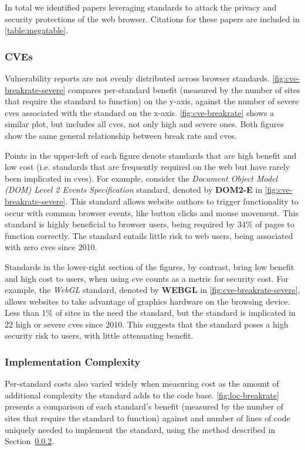 In total we identified \NumAttackPapers papers leveraging \NumAttackStandards
standards to attack the privacy and security protections of the web browser.
Citations for these papers are included in \ref{table:megatable}.


\subsubsection{CVEs}
\label{cost-benefit:results:costs-cves}


Vulnerability reports are not evenly distributed across browser standards.
\ref{fig:cve-breakrate-severe} compares per-standard
benefit (measured by the number of sites that require the standard to function)
on the y-axis, against the number of severe \gls{cve}s associated with the
standard on the x-axis.  \ref{fig:cve-breakrate} shows a similar plot, but
includes all \gls{cve}s, not only high and severe ones.  Both figures
show the same general relationship between break rate and \gls{cve}s.

Points in the upper-left of each figure denote standards that are high benefit
and low cost  (i.e. standards that are frequently required on the web but have
rarely been implicated in \gls{cve}s).  For example, consider the
\textit{Document Object Model (DOM) Level 2 Events Specification} standard,
denoted by \textbf{DOM2-E} in \ref{fig:cve-breakrate-severe}.  This
standard allows website authors to trigger functionality to occur with
common browser events, like button clicks and mouse movement.  This standard is highly
beneficial to browser users, being required by 34\% of pages to function
correctly.  The standard entails little risk to web users, being
associated with zero \gls{cve}s since 2010.

Standards in the lower-right section of the figures, by contrast, bring
low benefit and high cost to users, when using \gls{cve} counts as a metric
for security cost.  For example, the \textit{WebGL} standard, denoted by
\textbf{WEBGL} in \ref{fig:cve-breakrate-severe}, allows websites to take
advantage of graphics hardware on the browsing device.
Less than 1\% of sites in the \ATK need the standard, but
the standard is implicated in 22 high or severe \gls{cve}s since 2010.  This
suggests that the standard poses a high security risk to users, with
little attenuating benefit.


\subsubsection{Implementation Complexity}
\label{cost-benefit:results:costs-loc}

Per-standard costs also varied widely when measuring cost as the amount of
additional complexity the standard adds to the code base.
\ref{fig:loc-breakrate} presents a comparison of each standard's benefit
(measured by the number of sites that require the standard to function) against
and number of lines of code uniquely needed to implement the standard,
using the method described in Section~\ref{cost-benefit:results:costs-loc}.

